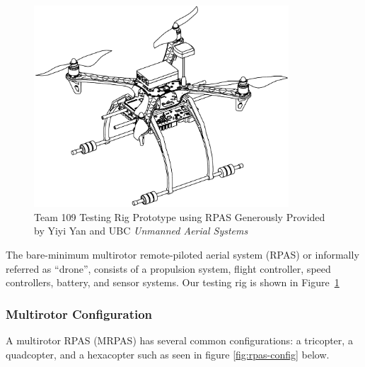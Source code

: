 \begin{figure}[H]
    \centering
    \includegraphics[width=0.85\textwidth]{img/testrigcad1.png}
    \caption{Team 109 Testing Rig Prototype using RPAS Generously Provided by Yiyi Yan and UBC \textit{Unmanned Aerial Systems}}
    \label{fig:testrigcad1}
\end{figure}

The bare-minimum multirotor remote-piloted aerial system (RPAS) or informally referred as ``drone'', consists of a propulsion system, flight controller, speed controllers, battery, and sensor systems. Our testing rig is shown  in Figure~\ref{fig:testrigcad1}

\subsubsection{Multirotor Configuration}

A multirotor RPAS (MRPAS) has several common configurations: a tricopter, a quadcopter, and a hexacopter such as seen in figure \ref{fig:rpas-config} below.

